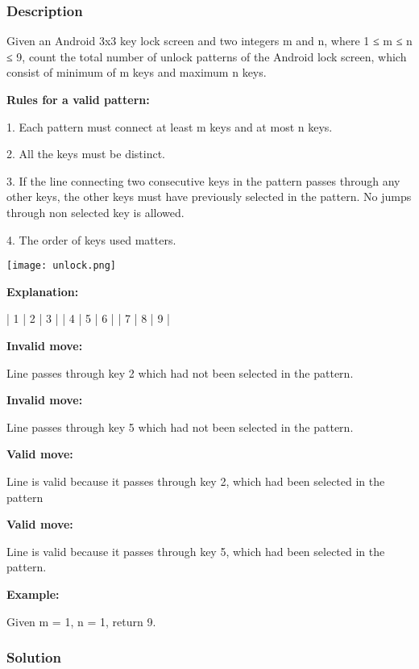 \subsubsection{Description}

Given an Android 3x3 key lock screen and two integers m and n, where 1 ≤ m ≤ n ≤ 9, count the total number of unlock patterns of the Android lock screen, which consist of minimum of m keys and maximum n keys.

\textbf{Rules for a valid pattern:}

1. Each pattern must connect at least m keys and at most n keys.

2. All the keys must be distinct.

3. If the line connecting two consecutive keys in the pattern passes through any other keys, the other keys must have previously selected in the pattern. No jumps through non selected key is allowed.

4. The order of keys used matters.

\begin{center}
\texttt{[image: unlock.png]}\\
\end{center}

\textbf{Explanation:}
\begin{Code}
| 1 | 2 | 3 |
| 4 | 5 | 6 |
| 7 | 8 | 9 |
\end{Code}

\textbf{Invalid move:} 

Line  passes through key 2 which had not been selected in the pattern.

\textbf{Invalid move:} 

Line  passes through key 5 which had not been selected in the pattern.

\textbf{Valid move:} 

Line  is valid because it passes through key 2, which had been selected in the pattern

\textbf{Valid move:} 

Line  is valid because it passes through key 5, which had been selected in the pattern.

\textbf{Example:}

Given m = 1, n = 1, return 9.

\subsubsection{Solution}
\begin{Code}
\end{Code}
\newpage